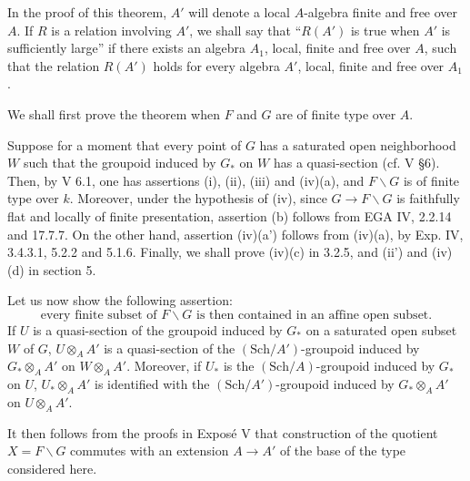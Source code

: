 In the proof of this theorem, $A'$ will denote a local $A$-algebra finite and free over $A$. If $R$ is a relation involving $A'$, we shall say that ``$R(A')$ is true when $A'$ is sufficiently large'' if there exists an algebra $A_1$, local, finite and free over $A$, such that the relation $R(A')$ holds for every algebra $A'$, local, finite and free over $A_1$.

We shall first prove the theorem when $F$ and $G$ are of finite type over $A$.

Suppose for a moment that every point of $G$ has a saturated open neighborhood $W$ such that the groupoid induced by $G_*$ on $W$ has a quasi-section (cf. V §6). Then, by V 6.1, one has assertions (i), (ii), (iii) and (iv)(a), and $F\backslash G$ is of finite type over $k$. Moreover, under the hypothesis of (iv), since $G\to F\backslash G$ is faithfully flat and locally of finite presentation, assertion (b) follows from EGA IV, 2.2.14 and 17.7.7. On the other hand, assertion (iv)(a') follows from (iv)(a), by Exp. IV, 3.4.3.1, 5.2.2 and 5.1.6. Finally, we shall prove (iv)(c) in 3.2.5, and (ii') and (iv)(d) in section 5.

Let us now show the following assertion:
\[
\text{every finite subset of }F\backslash G\text{ is then contained in an affine open subset.}\tag{$\dagger$}
\]
If $U$ is a quasi-section of the groupoid induced by $G_*$ on a saturated open subset $W$ of $G$, $U\otimes_AA'$ is a quasi-section of the $(\mathrm{Sch}/A')$-groupoid induced by $G_*\otimes_AA'$ on $W\otimes_AA'$. Moreover, if $U_*$ is the $(\mathrm{Sch}/A)$-groupoid induced by $G_*$ on $U$, $U_*\otimes_AA'$ is identified with the $(\mathrm{Sch}/A')$-groupoid induced by $G_*\otimes_AA'$ on $U\otimes_AA'$.

It then follows from the proofs in Exposé V that construction of the quotient $X=F\backslash G$ commutes with an extension $A\to A'$ of the base of the type considered here.

